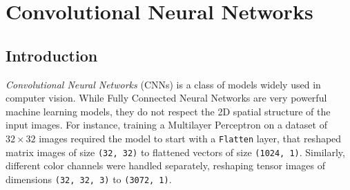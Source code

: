 \section{Convolutional Neural Networks}
\subsection{Introduction}
\emph{Convolutional Neural Networks} (CNNs) is a class of models widely used in computer vision. While Fully Connected Neural Networks are very powerful machine learning models, they do not respect the 2D spatial structure of the input images. For instance, training a Multilayer Perceptron on a dataset of $32\times 32$ images required the model to start with a \texttt{Flatten} layer, that reshaped matrix images of size \texttt{(32, 32)} to flattened vectors of size \texttt{(1024, 1)}. Similarly, different color channels were handled separately, reshaping tensor images of dimensions \texttt{(32, 32, 3)} to \texttt{(3072, 1)}.

